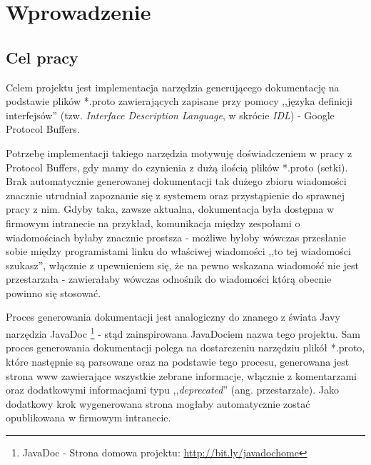 \documentclass[pdflatex,11pt]{aghdpl}
\author{Konrad Malawski}
\date{2011}
\begin{document}
\titlepages

\tableofcontents
\clearpage

%

\chapter{Wprowadzenie}
\label{cha:wprowadzenie}

\section{Cel pracy}
\label{sec:celePracy}

Celem projektu jest implementacja narzędzia generującego dokumentację na podstawie plików 
*.proto zawierających zapisane przy pomocy ,,języka definicji interfejsów'' (tzw. \textit{Interface Description Language}, w skrócie \textit{IDL}) - Google Protocol Buffers. 


Potrzebę implementacji takiego narzędzia motywuję doświadczeniem w pracy z Protocol Buffers, gdy mamy do czynienia z dużą ilością plików *.proto (setki). 
Brak automatycznie generowanej dokumentacji tak dużego zbioru wiadomości znacznie utrudniał zapoznanie się z systemem oraz przystąpienie do sprawnej pracy z nim.
Gdyby taka, zawsze aktualna, dokumentacja była dostępna w firmowym intranecie na przykład, komunikacja między zespołami o wiadomościach byłaby znacznie prostsza - 
możliwe byłoby wówczas przesłanie sobie między programistami linku do właściwej wiadomości ,,to tej wiadomości szukasz'', włącznie z upewnieniem się, że na pewno
wskazana wiadomość nie jest przestarzała - zawierałaby wówczas odnośnik do wiadomości którą obecnie powinno się stosować.


Proces generowania dokumentacji jest analogiczny do znanego z świata Javy narzędzia JavaDoc 
\footnote[1]{JavaDoc - Strona domowa projektu: \href{http://bit.ly/javadochome}{http://bit.ly/javadochome}} - stąd zainspirowana JavaDociem nazwa tego projektu. 
Sam proces generowania dokumentacji polega na dostarczeniu narzędziu plikół *.proto, które następnie są parsowane oraz na podstawie tego procesu, 
generowana jest strona www zawierające wszystkie zebrane informacje, włącznie z komentarzami oraz dodatkowymi informacjami 
typu ,,\textit{deprecated}'' (ang. przestarzałe). Jako dodatkowy krok wygenerowana strona mogłaby automatycznie zostać opublikowana w firmowym intranecie.
\end{document}
